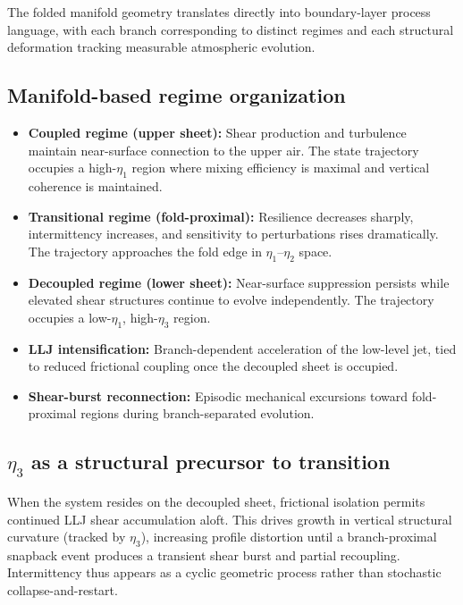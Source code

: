 \documentclass[12pt,a4paper]{article}
\begin{document}
The folded manifold geometry translates directly into boundary-layer process language, with each branch corresponding to distinct regimes and each structural deformation tracking measurable atmospheric evolution.

\subsection{Manifold-based regime organization}

\begin{itemize}
  \item \textbf{Coupled regime (upper sheet):} Shear production and turbulence maintain near-surface connection to the upper air. The state trajectory occupies a high-$\eta_1$ region where mixing efficiency is maximal and vertical coherence is maintained.
  \item \textbf{Transitional regime (fold-proximal):} Resilience decreases sharply, intermittency increases, and sensitivity to perturbations rises dramatically. The trajectory approaches the fold edge in $\eta_1$--$\eta_2$ space.
  \item \textbf{Decoupled regime (lower sheet):} Near-surface suppression persists while elevated shear structures continue to evolve independently. The trajectory occupies a low-$\eta_1$, high-$\eta_3$ region.
  \item \textbf{LLJ intensification:} Branch-dependent acceleration of the low-level jet, tied to reduced frictional coupling once the decoupled sheet is occupied.
  \item \textbf{Shear-burst reconnection:} Episodic mechanical excursions toward fold-proximal regions during branch-separated evolution.
\end{itemize}

\subsection{$\eta_3$ as a structural precursor to transition}

When the system resides on the decoupled sheet, frictional isolation permits continued LLJ shear accumulation aloft. This drives growth in vertical structural curvature (tracked by $\eta_3$), increasing profile distortion until a branch-proximal snapback event produces a transient shear burst and partial recoupling. Intermittency thus appears as a cyclic geometric process rather than stochastic collapse-and-restart.
\end{document}
